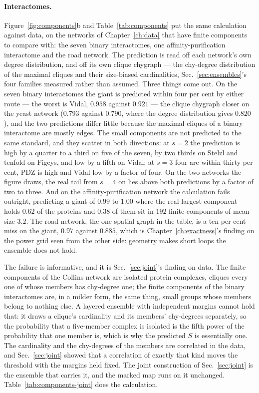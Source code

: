 \paragraph{Interactomes.} Figure~\ref{fig:components}b and
Table~\ref{tab:components} put the same calculation against data, on the
networks of Chapter~\ref{ch:data} that have finite components to compare
with: the seven binary interactomes, one affinity-purification interactome
and the road network. The prediction is read off each network's own
degree distribution, and off its own clique chygraph --- the chy-degree
distribution of the maximal cliques and their size-biased cardinalities,
Sec.~\ref{sec:ensembles}'s four families measured rather than assumed.
Three things come out. On the seven binary interactomes the giant is
predicted within four per cent by either route --- the worst is Vidal,
$0.958$ against $0.921$ --- the clique chygraph closer on the yeast network
($0.793$ against $0.790$, where the degree distribution gives $0.820$), and
the two predictions differ little because the maximal cliques of a binary
interactome are mostly edges. The small components are not predicted to
the same standard, and they scatter in both directions: at $s=2$ the
prediction is high by a quarter to a third on five of the seven, by two
thirds on Stelzl and tenfold on Figeys, and low by a fifth on Vidal; at
$s=3$ four are within thirty per cent, PDZ is high and Vidal low by a
factor of four. On the two networks the figure draws, the real tail from
$s=4$ on lies above both predictions by a factor of two to three. And on
the affinity-purification network the calculation fails outright,
predicting a giant of $0.99$ to $1.00$ where the real largest component
holds $0.62$ of the proteins and $0.38$ of them sit in $192$ finite
components of mean size $3.2$. The road network, the one spatial graph in
the table, is a ten per cent miss on the giant, $0.97$ against $0.885$,
which is Chapter~\ref{ch:exactness}'s finding on the power grid seen from
the other side: geometry makes short loops the ensemble does not hold.

The failure is informative, and it is Sec.~\ref{sec:joint}'s finding on
data. The finite components of the Collins network are isolated protein
complexes, cliques every one of whose members has chy-degree one; the
finite components of the binary interactomes are, in a milder form, the
same thing, small groups whose members belong to nothing else. A layered
ensemble with independent margins cannot hold that: it draws a clique's
cardinality and its members' chy-degrees separately, so the probability
that a five-member complex is isolated is the fifth power of the
probability that one member is, which is why the predicted $S$ is
essentially one. The cardinality and the chy-degrees of the members are
correlated in the data, and Sec.~\ref{sec:joint} showed that a correlation
of exactly that kind moves the threshold with the margins held fixed. The
joint construction of Sec.~\ref{sec:joint} is the ensemble that carries it,
and the marked map runs on it unchanged. Table~\ref{tab:components-joint}
does the calculation.


